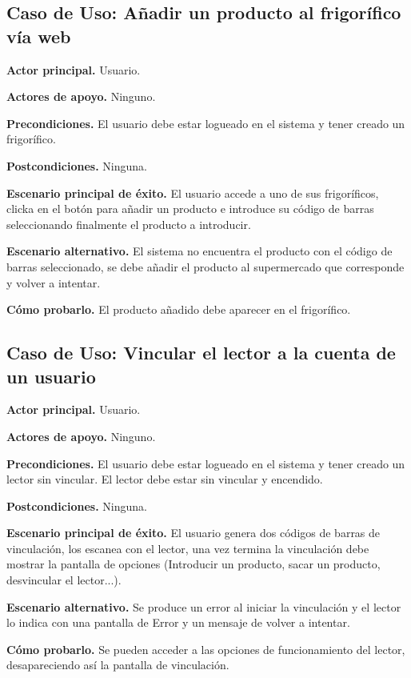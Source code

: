 \subsection{Caso de Uso: Añadir un producto al frigorífico vía web}

    \textbf{Actor principal.} Usuario.

    \textbf{Actores de apoyo.} Ninguno.

    \textbf{Precondiciones.} El usuario debe estar logueado en el sistema y tener creado un frigorífico.

    \textbf{Postcondiciones.} Ninguna.

    \textbf{Escenario principal de éxito.} El usuario accede a uno de sus frigoríficos, clicka en el botón para añadir un producto e introduce su código de barras seleccionando finalmente el producto a introducir.

    \textbf{Escenario alternativo.} El sistema no encuentra el producto con el código de barras seleccionado, se debe añadir el producto al supermercado que corresponde y volver a intentar.

    \textbf{Cómo probarlo.} El producto añadido debe aparecer en el frigorífico.

\subsection{Caso de Uso: Vincular el lector a la cuenta de un usuario}

    \textbf{Actor principal.} Usuario.

    \textbf{Actores de apoyo.} Ninguno.

    \textbf{Precondiciones.} El usuario debe estar logueado en el sistema y tener creado un lector sin vincular. El lector debe estar sin vincular y encendido.

    \textbf{Postcondiciones.} Ninguna.

    \textbf{Escenario principal de éxito.} El usuario genera dos códigos de barras de vinculación, los escanea con el lector, una vez termina la vinculación debe mostrar la pantalla de opciones (Introducir un producto, sacar un producto, desvincular el lector...).

    \textbf{Escenario alternativo.} Se produce un error al iniciar la vinculación y el lector lo indica con una pantalla de Error y un mensaje de volver a intentar.

    \textbf{Cómo probarlo.} Se pueden acceder a las opciones de funcionamiento del lector, desapareciendo así la pantalla de vinculación.

